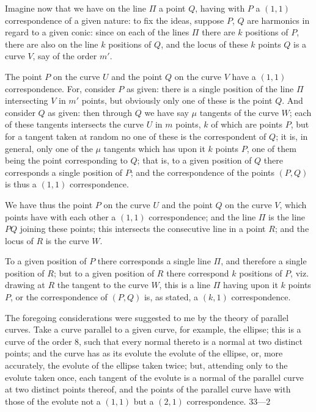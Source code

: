 \documentclass[12pt,a4paper]{article}
\theoremstyle{cayley}
\theoremstyle{definition}
\numberwithin{equation}{section}
\begin{document}
Imagine now that we have on the line $\Pi$ a point $Q$, having with $P$ a $(1,1)$ correspondence of a given nature: to fix the ideas, suppose $P$, $Q$ are harmonics in regard to a given conic: since on each of the lines $\Pi$ there are $k$ positions of $P$, there are also on the line $k$ positions of $Q$, and the locus of these $k$ points $Q$ is a curve $V$, say of the order $m'$.

The point $P$ on the curve $U$ and the point $Q$ on the curve $V$ have a $(1,1)$ correspondence. For, consider $P$ as given: there is a single position of the line $\Pi$ intersecting $V$ in $m'$ points, but obviously only one of these is the point $Q$. And consider $Q$ as given: then through $Q$ we have say $\mu$ tangents of the curve $W$; each of these tangents intersects the curve $U$ in $m$ points, $k$ of which are points $P$, but for a tangent taken at random no one of these is the correspondent of $Q$; it is, in general, only one of the $\mu$ tangents which has upon it $k$ points $P$, one of them being the point corresponding to $Q$; that is, to a given position of $Q$ there corresponds a single position of $P$; and the correspondence of the points $(P, Q)$ is thus a $(1,1)$ correspondence.

We have thus the point $P$ on the curve $U$ and the point $Q$ on the curve $V$, which points have with each other a $(1,1)$ correspondence; and the line $\Pi$ is the line $PQ$ joining these points; this intersects the consecutive line in a point $R$; and the locus of $R$ is the curve $W$.

To a given position of $P$ there corresponds a single line $\Pi$, and therefore a single position of $R$; but to a given position of $R$ there correspond $k$ positions of $P$, viz. drawing at $R$ the tangent to the curve $W$, this is a line $\Pi$ having upon it $k$ points $P$, or the correspondence of $(P, Q)$ is, as stated, a $(k,1)$ correspondence.

The foregoing considerations were suggested to me by the theory of parallel curves. Take a curve parallel to a given curve, for example, the ellipse; this is a curve of the order 8, such that every normal thereto is a normal at two distinct points; and the curve has as its evolute the evolute of the ellipse, or, more accurately, the evolute of the ellipse taken twice; but, attending only to the evolute taken once, each tangent of the evolute is a normal of the parallel curve at two distinct points thereof, and the points of the parallel curve have with those of the evolute not a $(1,1)$ but a $(2,1)$ correspondence.
\hfill $33\text{---}2$
\end{document}
